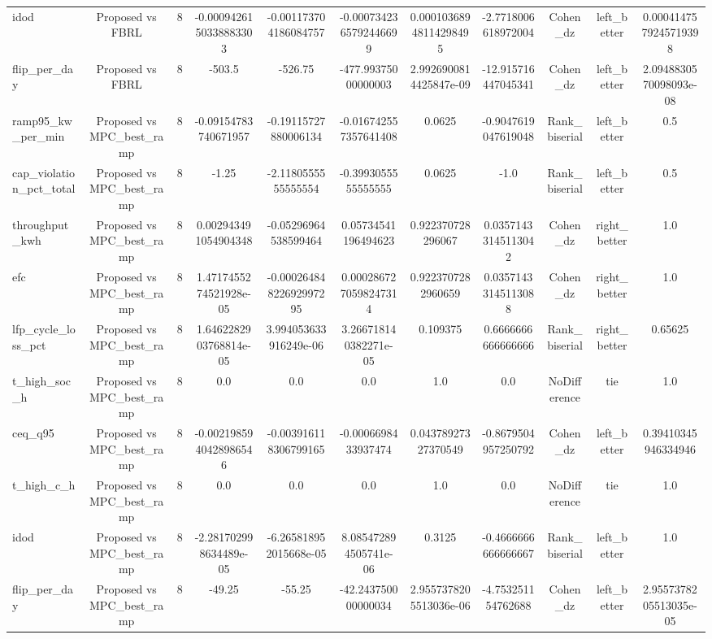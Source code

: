 \begin{table}[t]
\begin{tabular}{lcccccccccc}
idod & Proposed vs FBRL & 8 & -0.0009426150338883303 & -0.001173704186084757 & -0.0007342365792446699 & 0.00010368948114298495 & -2.7718006618972004 & Cohen\_dz & left\_better & 0.0004147579245719398 \\
flip\_per\_day & Proposed vs FBRL & 8 & -503.5 & -526.75 & -477.99375000000003 & 2.9926900814425847e-09 & -12.915716447045341 & Cohen\_dz & left\_better & 2.0948830570098093e-08 \\
ramp95\_kw\_per\_min & Proposed vs MPC\_best\_ramp & 8 & -0.09154783740671957 & -0.19115727880006134 & -0.016742557357641408 & 0.0625 & -0.9047619047619048 & Rank\_biserial & left\_better & 0.5 \\
cap\_violation\_pct\_total & Proposed vs MPC\_best\_ramp & 8 & -1.25 & -2.1180555555555554 & -0.3993055555555555 & 0.0625 & -1.0 & Rank\_biserial & left\_better & 0.5 \\
throughput\_kwh & Proposed vs MPC\_best\_ramp & 8 & 0.002943491054904348 & -0.05296964538599464 & 0.05734541196494623 & 0.922370728296067 & 0.03571433145113042 & Cohen\_dz & right\_better & 1.0 \\
efc & Proposed vs MPC\_best\_ramp & 8 & 1.4717455274521928e-05 & -0.00026484822692997295 & 0.0002867270598247314 & 0.9223707282960659 & 0.03571433145113088 & Cohen\_dz & right\_better & 1.0 \\
lfp\_cycle\_loss\_pct & Proposed vs MPC\_best\_ramp & 8 & 1.6462282903768814e-05 & 3.994053633916249e-06 & 3.266718140382271e-05 & 0.109375 & 0.6666666666666666 & Rank\_biserial & right\_better & 0.65625 \\
t\_high\_soc\_h & Proposed vs MPC\_best\_ramp & 8 & 0.0 & 0.0 & 0.0 & 1.0 & 0.0 & NoDifference & tie & 1.0 \\
ceq\_q95 & Proposed vs MPC\_best\_ramp & 8 & -0.0021985940428986546 & -0.003916118306799165 & -0.0006698433937474 & 0.04378927327370549 & -0.8679504957250792 & Cohen\_dz & left\_better & 0.39410345946334946 \\
t\_high\_c\_h & Proposed vs MPC\_best\_ramp & 8 & 0.0 & 0.0 & 0.0 & 1.0 & 0.0 & NoDifference & tie & 1.0 \\
idod & Proposed vs MPC\_best\_ramp & 8 & -2.281702998634489e-05 & -6.265818952015668e-05 & 8.085472894505741e-06 & 0.3125 & -0.4666666666666667 & Rank\_biserial & left\_better & 1.0 \\
flip\_per\_day & Proposed vs MPC\_best\_ramp & 8 & -49.25 & -55.25 & -42.243750000000034 & 2.9557378205513036e-06 & -4.753251154762688 & Cohen\_dz & left\_better & 2.9557378205513035e-05 \\

\end{tabular}
\end{table}
